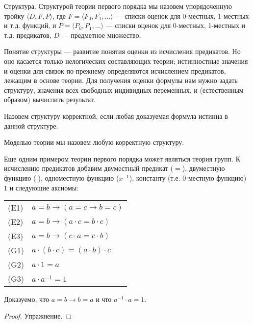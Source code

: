 \begin{definition}{Структура.} 
Структурой теории первого порядка мы назовем упорядоченную тройку $\langle{}D, F, P\rangle$,
где $F = \langle{}F_0, F_1, ... \rangle$ --- списки оценок для 0-местных, 1-местных и т.д. функций, 
и $P = \langle{}P_0, P_1, ... \rangle$ --- списки оценок для 0-местных, 1-местных и т.д. предикатов,
$D$ --- предметное множество. 
\end{definition}

Понятие структуры --- развитие понятия оценки из исчисления предикатов. Но оно касается 
только нелогических составляющих теории; истинностные значения и оценки для связок по-прежнему
определяются исчислением предикатов, лежащим в основе теории.
Для получения оценки формулы нам нужно задать структуру, значения всех свободных
индивидных переменных, и (естественным образом) вычислить результат.

\begin{definition}
Назовем структуру корректной, если любая доказуемая формула истинна в данной структуре.
\end{definition}

\begin{definition}Моделью теории мы назовем любую корректную структуру.\end{definition}

Еще одним примером теории первого порядка может являться теория групп.
К исчислению предикатов добавим двуместный предикат ($=$), 
двуместную функцию ($\cdot$), одноместную функцию ($x^{-1}$), константу (т.е. 0-местную функцию) $1$
и следующие аксиомы:

\begin{tabular}{ll}
(E1) & $a = b \rightarrow (a = c \rightarrow b = c)$\\
(E2) & $a = b \rightarrow (a \cdot c = b \cdot c)$\\
(E3) & $a = b \rightarrow (c \cdot a = c \cdot b)$\\
(G1) & $a \cdot (b \cdot c) = (a \cdot b) \cdot c$\\
(G2) & $a \cdot 1 = a$\\
(G3) & $a \cdot a ^ {-1} = 1$
\end{tabular}

\begin{theorem}Доказуемо, что $a=b \rightarrow b=a$ и что $a^{-1} \cdot a = 1$.
\end{theorem}
\begin{proof} Упражнение. \end{proof}

